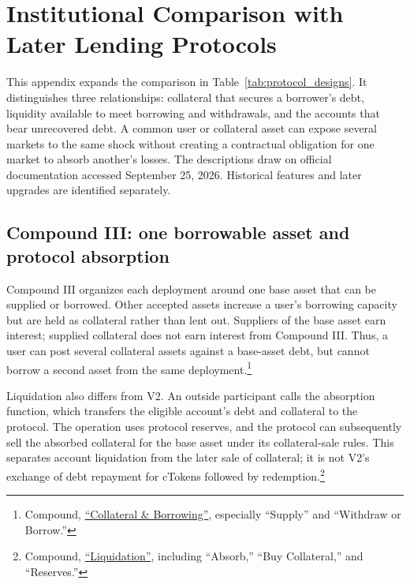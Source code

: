 \documentclass[a4paper,UKenglish,cleveref, autoref, thm-restate]{informs3}
\DeclareRobustCommand{\latestrev}[1]{{\color{red}\hypersetup{linkcolor=red,citecolor=red,urlcolor=red}#1}}
\newenvironment{latestrevisions}{\begingroup\color{red}\hypersetup{linkcolor=red,citecolor=red,urlcolor=red}}{\endgroup}
\begin{document}
\clearpage
\begin{latestrevisions}
\section{Institutional Comparison with Later Lending Protocols}
\label{app:later_protocols}

This appendix expands the comparison in Table~\ref{tab:protocol_designs}. It distinguishes three relationships: collateral that secures a borrower's debt, liquidity available to meet borrowing and withdrawals, and the accounts that bear unrecovered debt. A common user or collateral asset can expose several markets to the same shock without creating a contractual obligation for one market to absorb another's losses. The descriptions draw on official documentation accessed September 25, 2026. Historical features and later upgrades are identified separately.

\subsection{Compound III: one borrowable asset and protocol absorption}
\label{app:later_protocols_compound3}

Compound III organizes each deployment around one base asset that can be supplied or borrowed. Other accepted assets increase a user's borrowing capacity but are held as collateral rather than lent out. Suppliers of the base asset earn interest; supplied collateral does not earn interest from Compound III. Thus, a user can post several collateral assets against a base-asset debt, but cannot borrow a second asset from the same deployment.\footnote{\latestrev{Compound, \href{https://docs.compound.finance/collateral-and-borrowing/}{``Collateral \& Borrowing''}, especially ``Supply'' and ``Withdraw or Borrow.''}}

Liquidation also differs from V2. An outside participant calls the absorption function, which transfers the eligible account's debt and collateral to the protocol. The operation uses protocol reserves, and the protocol can subsequently sell the absorbed collateral for the base asset under its collateral-sale rules. This separates account liquidation from the later sale of collateral; it is not V2's exchange of debt repayment for cTokens followed by redemption.\footnote{\latestrev{Compound, \href{https://docs.compound.finance/liquidation/}{``Liquidation''}, including ``Absorb,'' ``Buy Collateral,'' and ``Reserves.''}}


\end{latestrevisions}
\end{document}
